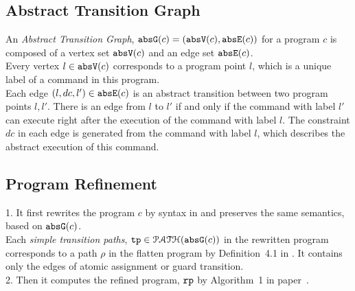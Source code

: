 \subsection{Abstract Transition Graph}
\label{sec:abs_prog}
An \emph{Abstract Transition Graph}, $\mathtt{abs}{\mathtt{G}}(c) =(\mathtt{abs}{\mathtt{V}}(c), \mathtt{abs}{\mathtt{E}}(c))$ for a program $c$ is composed of
a vertex set $\mathtt{abs}{\mathtt{V}}(c)$ and an edge set $\mathtt{abs}{\mathtt{E}}(c)$.
%
\\
Every 
vertex $l \in \mathtt{abs}{\mathtt{V}}(c)$ corresponds to a program point $l$, which is a unique
label of a command in this program.
\\
Each edge $(l, dc, l') \in \mathtt{abs}{\mathtt{E}}(c)$ is an abstract transition
between two program points $l, l'$. 
There is an edge from $l$ to $l'$ if and only if
the command with label $l'$ can execute right after the execution of the command with label $l$.
The constraint $dc$ in each edge is generated from the command with label $l$, which describes the abstract execution of this command.
\subsection{Program Refinement}
\label{sec:refine}
1. It first rewrites the program $c$ by syntax in \cite{GulwaniJK09} and preserves the same semantics, based on $\mathtt{abs}{\mathtt{G}}(c)$.
\\
Each \emph{simple transition paths}, $\mathtt{tp} \in \mathcal{PATH}(\mathtt{abs}{\mathtt{G}}(c))$ in the rewritten program
corresponds to a path $\rho$ in the flatten program by Definition~4.1 in \cite{GulwaniJK09}.
%
It contains only the edges of atomic assignment or guard transition.
\\
2. Then it computes the 
refined program, $\mathtt{rp}$ by Algorithm~1 in paper~\cite{GulwaniJK09}.
%
